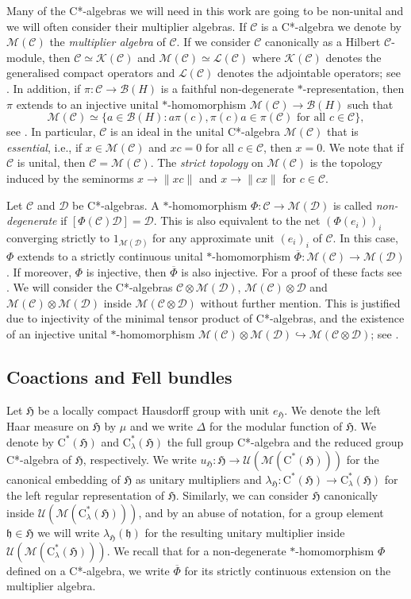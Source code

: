 \documentclass[11pt,final]{amsart}
\numberwithin{equation}{section}
\theoremstyle{plain}
\theoremstyle{definition}
\theoremstyle{remark}
\newcommand{\B}{{\mathcal{B}}}
\newcommand{\C}{{\mathcal{C}}}
\newcommand{\D}{{\mathcal{D}}}
\newcommand{\K}{{\mathcal{K}}}
\renewcommand{\L}{{\mathcal{L}}}
\newcommand{\M}{{\mathcal{M}}}
\newcommand{\U}{{\mathcal{U}}}
\def\De{\Delta}
\def\la{\lambda}
\newcommand{\fH}{{\mathfrak{H}}}
\newcommand{\fh}{{\mathfrak{h}}}
\newcommand{\foral}{\text{ for all }}
\newcommand{\ca}{\mathrm{C}^*}
\newcommand{\ol}{\overline}
\begin{document}
Many of the C*-algebras we will need in this work are going to be non-unital and we will often consider their multiplier algebras. If $\C$ is a C*-algebra we denote by $\M(\C)$ the \emph{multiplier algebra} of $\C$. If we consider $\C$ canonically as a Hilbert $\C$-module, then $\C\simeq \K(\C)$ and $\M(\C)\simeq \L(\C)$ where $\K(\C)$ denotes the generalised compact operators and $\L(\C)$ denotes the adjointable operators; see \cite[Sections~1 and~2]{Lan95}. 
In addition, if $\pi \colon \C \to \B(H)$ is a faithful non-degenerate $*$-representation, then $\pi$ extends to an injective unital $*$-homomorphism $\M(\C) \to \B(H)$ such that
\[
\M(\C)\simeq \{ a\in \B(H) : a \pi(c), \pi(c)a \in \pi(\C) \foral c\in \C\},
\]
see \cite[Proposition 3.12.3]{Ped79}. In particular, $\C$ is an ideal in the unital C*-algebra $\M(\C)$ that is \emph{essential}, i.e., if $x\in \M(\C)$ and $x c=0$ for all $c\in \C$, then $x=0$.  We note that if $\C$ is unital, then $\C=\M(\C)$.
The \emph{strict topology} on $\M(\C)$ is the topology induced by the seminorms $x \to \|xc\|$ and $x \to \|c x\|$ for $c\in \C$.

Let $\C$ and $\D$ be C*-algebras. A $*$-homomorphism $\Phi \colon \C \to \M(\D)$ is called \emph{non-degenerate} if $[\Phi(\C) \D]=\D$. This is also equivalent to the net $(\Phi(e_i))_i$ converging strictly to $1_{\M(\D)}$ for any approximate unit $(e_i)_i$ of $\C$. In this case, $\Phi$ extends to a strictly continuous unital $*$-homomorphism $\ol{\Phi} \colon \M(\C)\to \M(\D)$. If moreover, $\Phi$ is injective, then $\ol{\Phi}$ is also injective. For a proof of these facts
see \cite[Proposition 2.1 and Proposition 2.5]{Lan95}. We will consider the C*-algebras $\C\otimes \M(\D)$, $\M(\C)\otimes \D$ and $\M(\C)\otimes \M(\D)$ inside $\M(\C\otimes \D)$ without further mention. This is justified due to injectivity of the minimal tensor product of C*-algebras, and the existence of an injective unital $*$-homomorphism $\M(\C)\otimes \M(\D) \hookrightarrow\M(\C\otimes \D)$; see \cite[Pages 35--37]{Lan95}.

\subsection{Coactions and Fell bundles}

Let $\fH$ be a locally compact Hausdorff group with unit $e_{\fH}$. We denote the left Haar measure on $\fH$ by $\mu$ and we write $\De$ for the modular function of $\fH$.
We denote by $\ca(\fH)$ and $\ca_\la(\fH)$ the full group C*-algebra and the reduced group C*-algebra of $\fH$, respectively. 
We write $u_{\fH} \colon \fH \to \U(\M(\ca(\fH)))$ for the canonical embedding of $\fH$ as unitary multipliers and $\la_{\fH} \colon \ca(\fH) \to \ca_\la(\fH)$ for the left regular representation of $\fH$. Similarly, we can consider $\fH$ canonically inside $\U(\M(\ca_\la(\fH)))$, and by an abuse of notation, for a group element $\fh\in \fH$ we will write $\la_{\fH}(\fh)$ for the resulting unitary multiplier inside $\U(\M(\ca_\la(\fH)))$.
We recall that for a non-degenerate $*$-homomorphism $\Phi$ defined on a C*-algebra, we write $\ol{\Phi}$ for its strictly continuous extension on the multiplier algebra.
\end{document}
